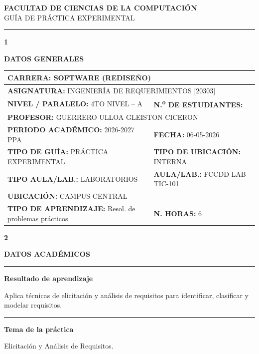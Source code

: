 \documentclass[11pt,a4paper]{article}
\newcommand{\secband}[2]{%
  \par\vspace{9pt}\noindent
  {\setlength{\fboxsep}{0pt}%
   \colorbox{secdark}{\parbox[c][20pt][c]{0.05\textwidth}{\centering\textbf{\color{white}\small #1}}}%
   \colorbox{secblue}{\parbox[c][20pt][c]{0.95\textwidth}{\hspace{8pt}\textbf{\color{white}\small #2}}}%
  }\par\vspace{5pt}}
\newcommand{\submark}[1]{\par\vspace{4pt}\noindent
  {\color{secblue}\rule[-1pt]{3.5pt}{12pt}}\hspace{6pt}\textbf{\color{secdark}#1}\par\vspace{2pt}}
\newcommand{\fld}[1]{\textbf{\color{secdark}#1}}
\begin{document}
\begin{center}
  {\large\bfseries\color{secdark}FACULTAD DE CIENCIAS DE LA COMPUTACIÓN}\\[2pt]
  {\small\color{secdark}GUÍA DE PRÁCTICA EXPERIMENTAL}\\[2pt]
  \textcolor{secdark}{\rule{0.55\textwidth}{1pt}}
\end{center}
\vspace{2pt}

\secband{1}{DATOS GENERALES}
\renewcommand{\arraystretch}{1.35}
\noindent\begin{tabular}{|p{3.2cm}|p{4.6cm}|p{3.7cm}|p{3.6cm}|}
\hline
\multicolumn{4}{|l|}{\fld{CARRERA:} SOFTWARE (REDISEÑO)}\\
\hline
\multicolumn{4}{|l|}{\fld{ASIGNATURA:} INGENIERÍA DE REQUERIMIENTOS [20303]}\\
\hline
\multicolumn{2}{|l|}{\fld{NIVEL / PARALELO:} 4TO NIVEL – A} & \multicolumn{2}{l|}{\fld{N.\textsuperscript{o} DE ESTUDIANTES:}}\\
\hline
\multicolumn{4}{|l|}{\fld{PROFESOR:} GUERRERO ULLOA GLEISTON CICERON}\\
\hline
\multicolumn{2}{|l|}{\fld{PERIODO ACADÉMICO:} 2026-2027 PPA} & \multicolumn{2}{l|}{\fld{FECHA:} 06-05-2026}\\
\hline
\multicolumn{2}{|l|}{\fld{TIPO DE GUÍA:} PRÁCTICA EXPERIMENTAL} & \multicolumn{2}{l|}{\fld{TIPO DE UBICACIÓN:} INTERNA}\\
\hline
\multicolumn{2}{|l|}{\fld{TIPO AULA/LAB.:} LABORATORIOS} & \multicolumn{2}{l|}{\fld{AULA/LAB.:} FCCDD-LAB-TIC-101}\\
\hline
\multicolumn{4}{|l|}{\fld{UBICACIÓN:} CAMPUS CENTRAL}\\
\hline
\multicolumn{2}{|l|}{\fld{TIPO DE APRENDIZAJE:} Resol. de problemas prácticos} & \multicolumn{2}{l|}{\fld{N. HORAS:} 6}\\
\hline
\end{tabular}

\secband{2}{DATOS ACADÉMICOS}
\submark{Resultado de aprendizaje}
Aplica técnicas de elicitación y análisis de requisitos para identificar, clasificar y modelar requisitos.
\submark{Tema de la práctica}
Elicitación y Análisis de Requisitos.
\end{document}
